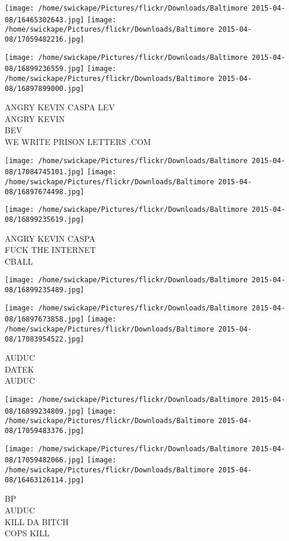 \documentclass[10pt,letterpaper]{article}
\begin{document}
\texttt{[image: /home/swickape/Pictures/flickr/Downloads/Baltimore 2015-04-08/16465302643.jpg]}
\texttt{[image: /home/swickape/Pictures/flickr/Downloads/Baltimore 2015-04-08/17059482216.jpg]}

\texttt{[image: /home/swickape/Pictures/flickr/Downloads/Baltimore 2015-04-08/16899236559.jpg]}
\texttt{[image: /home/swickape/Pictures/flickr/Downloads/Baltimore 2015-04-08/16897899000.jpg]}

ANGRY KEVIN CASPA LEV\\
ANGRY KEVIN\\
BEV\\
WE WRITE PRISON LETTERS .COM
\pagebreak

\texttt{[image: /home/swickape/Pictures/flickr/Downloads/Baltimore 2015-04-08/17084745101.jpg]}
\texttt{[image: /home/swickape/Pictures/flickr/Downloads/Baltimore 2015-04-08/16897674498.jpg]}

\texttt{[image: /home/swickape/Pictures/flickr/Downloads/Baltimore 2015-04-08/16899235619.jpg]}

ANGRY KEVIN CASPA\\
FUCK THE INTERNET\\
CBALL
\pagebreak

\texttt{[image: /home/swickape/Pictures/flickr/Downloads/Baltimore 2015-04-08/16899235489.jpg]}

\vspace{0.25in}
\texttt{[image: /home/swickape/Pictures/flickr/Downloads/Baltimore 2015-04-08/16897673858.jpg]}
\texttt{[image: /home/swickape/Pictures/flickr/Downloads/Baltimore 2015-04-08/17083954522.jpg]}

AUDUC\\
DATEK\\
AUDUC
\pagebreak

\texttt{[image: /home/swickape/Pictures/flickr/Downloads/Baltimore 2015-04-08/16899234809.jpg]}
\texttt{[image: /home/swickape/Pictures/flickr/Downloads/Baltimore 2015-04-08/17059483376.jpg]}

\texttt{[image: /home/swickape/Pictures/flickr/Downloads/Baltimore 2015-04-08/17059482066.jpg]}
\texttt{[image: /home/swickape/Pictures/flickr/Downloads/Baltimore 2015-04-08/16463126114.jpg]}

BP\\
AUDUC\\
KILL DA BITCH\\
COPS KILL
\pagebreak
\end{document}
